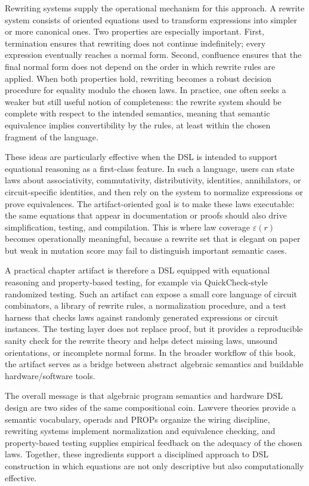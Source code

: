 Rewriting systems supply the operational mechanism for this approach. A rewrite system consists of oriented equations used to transform expressions into simpler or more canonical ones. Two properties are especially important. First, termination ensures that rewriting does not continue indefinitely; every expression eventually reaches a normal form. Second, confluence ensures that the final normal form does not depend on the order in which rewrite rules are applied. When both properties hold, rewriting becomes a robust decision procedure for equality modulo the chosen laws. In practice, one often seeks a weaker but still useful notion of completeness: the rewrite system should be complete with respect to the intended semantics, meaning that semantic equivalence implies convertibility by the rules, at least within the chosen fragment of the language.

These ideas are particularly effective when the DSL is intended to support equational reasoning as a first-class feature. In such a language, users can state laws about associativity, commutativity, distributivity, identities, annihilators, or circuit-specific identities, and then rely on the system to normalize expressions or prove equivalences. The artifact-oriented goal is to make these laws executable: the same equations that appear in documentation or proofs should also drive simplification, testing, and compilation. This is where law coverage \(\varepsilon(r)\) becomes operationally meaningful, because a rewrite set that is elegant on paper but weak in mutation score may fail to distinguish important semantic cases.

A practical chapter artifact is therefore a DSL equipped with equational reasoning and property-based testing, for example via QuickCheck-style randomized testing. Such an artifact can expose a small core language of circuit combinators, a library of rewrite rules, a normalization procedure, and a test harness that checks laws against randomly generated expressions or circuit instances. The testing layer does not replace proof, but it provides a reproducible sanity check for the rewrite theory and helps detect missing laws, unsound orientations, or incomplete normal forms. In the broader workflow of this book, the artifact serves as a bridge between abstract algebraic semantics and buildable hardware/software tools.

The overall message is that algebraic program semantics and hardware DSL design are two sides of the same compositional coin. Lawvere theories provide a semantic vocabulary, operads and PROPs organize the wiring discipline, rewriting systems implement normalization and equivalence checking, and property-based testing supplies empirical feedback on the adequacy of the chosen laws. Together, these ingredients support a disciplined approach to DSL construction in which equations are not only descriptive but also computationally effective.

